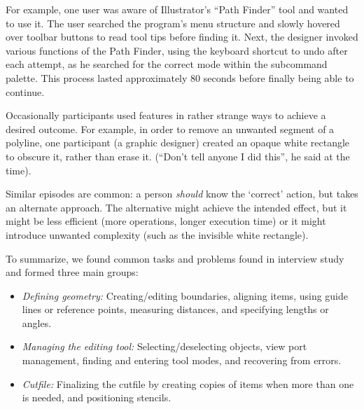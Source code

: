 \documentclass{article}
\begin{document}
For example, one user was aware of Illustrator's ``Path Finder'' tool
and wanted to use it. The user searched the program's menu structure
and slowly hovered over toolbar buttons to read tool tips before
finding it. Next, the designer invoked various functions of the Path
Finder, using the keyboard shortcut to undo after each attempt, as he
searched for the correct mode within the subcommand palette. This
process lasted approximately 80 seconds before finally being able to
continue.

Occasionally participants used features in rather strange ways to
achieve a desired outcome. For example, in order to remove an unwanted
segment of a polyline, one participant (a graphic designer) created an
opaque white rectangle to obscure it, rather than erase it. (``Don't
tell anyone I did this'', he said at the time).

Similar episodes are common: a person \textit{should} know the
`correct' action, but takes an alternate approach. The alternative
might achieve the intended effect, but it might be less efficient
(more operations, longer execution time) or it might introduce
unwanted complexity (such as the invisible white rectangle).

To summarize, we found common tasks and problems found in interview
study and formed three main groups:

\begin{itemize}
\item \textit{Defining geometry:} Creating/editing boundaries,
  aligning items, using guide lines or reference points, measuring
  distances, and specifying lengths or angles.
\item \textit{Managing the editing tool:} Selecting/deselecting
  objects, view port management, finding and entering tool modes, and
  recovering from errors.
\item \textit{Cutfile:} Finalizing the cutfile by creating copies of
  items when more than one is needed, and positioning stencils.
\end{itemize}


\end{document}
